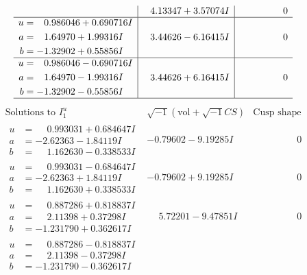 \documentclass[1p]{elsarticle_modified}
\theoremstyle{definition}
\newcommand{\I}{\sqrt{-1}}
\begin{document}
$$\begin{array}{c|c|c}
 & \phantom{-}4.13347 + 3.57074 I & \phantom{-0.000000 } 0 \\ \hline\begin{aligned}
u &= \phantom{-}0.986046 + 0.690716 I \\
a &= \phantom{-}1.64970 + 1.99316 I \\
b &= -1.32902 + 0.55856 I\end{aligned}
 & \phantom{-}3.44626 - 6.16415 I & \phantom{-0.000000 } 0 \\ \hline\begin{aligned}
u &= \phantom{-}0.986046 - 0.690716 I \\
a &= \phantom{-}1.64970 - 1.99316 I \\
b &= -1.32902 - 0.55856 I\end{aligned}
 & \phantom{-}3.44626 + 6.16415 I & \phantom{-0.000000 } 0\\
 \hline 
 \end{array}$$\newpage$$\begin{array}{c|c|c}  
\text{Solutions to }I^u_{1}& \I (\text{vol} + \sqrt{-1}CS) & \text{Cusp shape}\\
 \hline 
\begin{aligned}
u &= \phantom{-}0.993031 + 0.684647 I \\
a &= -2.62363 - 1.84119 I \\
b &= \phantom{-}1.162630 - 0.338533 I\end{aligned}
 & -0.79602 - 9.19285 I & \phantom{-0.000000 } 0 \\ \hline\begin{aligned}
u &= \phantom{-}0.993031 - 0.684647 I \\
a &= -2.62363 + 1.84119 I \\
b &= \phantom{-}1.162630 + 0.338533 I\end{aligned}
 & -0.79602 + 9.19285 I & \phantom{-0.000000 } 0 \\ \hline\begin{aligned}
u &= \phantom{-}0.887286 + 0.818837 I \\
a &= \phantom{-}2.11398 + 0.37298 I \\
b &= -1.231790 + 0.362617 I\end{aligned}
 & \phantom{-}5.72201 - 9.47851 I & \phantom{-0.000000 } 0 \\ \hline\begin{aligned}
u &= \phantom{-}0.887286 - 0.818837 I \\
a &= \phantom{-}2.11398 - 0.37298 I \\
b &= -1.231790 - 0.362617 I\end{aligned}

\end{array}$$
\end{document}
